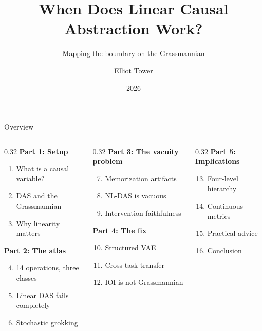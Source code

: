 \documentclass[aspectratio=169,11pt]{beamer}
\title{When Does Linear Causal Abstraction Work?}
\subtitle{Mapping the boundary on the Grassmannian}
\author{Elliot Tower}
\date{2026}
\institute{}
\begin{document}
\maketitle

\begin{frame}{Overview}
\begin{columns}[T]
\begin{column}{0.32\textwidth}
\textbf{Part 1: Setup}
\begin{enumerate}
  \item What is a causal variable?
  \item DAS and the Grassmannian
  \item Why linearity matters
\end{enumerate}
\vspace{0.5em}
\textbf{Part 2: The atlas}
\begin{enumerate}
  \setcounter{enumi}{3}
  \item 14 operations, three classes
  \item Linear DAS fails completely
  \item Stochastic grokking
\end{enumerate}
\end{column}
\begin{column}{0.32\textwidth}
\textbf{Part 3: The vacuity problem}
\begin{enumerate}
  \setcounter{enumi}{6}
  \item Memorization artifacts
  \item NL-DAS is vacuous
  \item Intervention faithfulness
\end{enumerate}
\vspace{0.5em}
\textbf{Part 4: The fix}
\begin{enumerate}
  \setcounter{enumi}{9}
  \item Structured VAE
  \item Cross-task transfer
  \item IOI is not Grassmannian
\end{enumerate}
\end{column}
\begin{column}{0.32\textwidth}
\textbf{Part 5: Implications}
\begin{enumerate}
  \setcounter{enumi}{12}
  \item Four-level hierarchy
  \item Continuous metrics
  \item Practical advice
  \item Conclusion
\end{enumerate}
\end{column}
\end{columns}
\end{frame}
\end{document}
